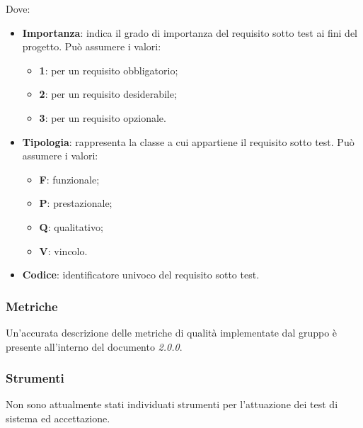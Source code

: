       Dove:
      \begin{itemize}
      	\item{\textbf{Importanza}: indica il grado di importanza del requisito sotto test ai fini del progetto. Può assumere i valori:}
      	\begin{itemize}
      		\item{\textbf{1}: per un requisito obbligatorio;}
      		\item{\textbf{2}: per un requisito desiderabile;}
      		\item{\textbf{3}: per un requisito opzionale.}
      	\end{itemize}
      	
      	\item{\textbf{Tipologia}: rappresenta la classe a cui appartiene il requisito sotto test. Può assumere i valori:}
      	\begin{itemize}
      		\item{\textbf{F}: funzionale;}
      		\item{\textbf{P}: prestazionale;}
      		\item{\textbf{Q}: qualitativo;}
      		\item{\textbf{V}: vincolo.}
      	\end{itemize}
      	
      	\item{\textbf{Codice}: identificatore univoco del requisito sotto test}.
      \end{itemize}
    \subsubsection{Metriche}
    Un'accurata descrizione delle metriche di qualità implementate dal gruppo è presente all'interno del documento \PdQ{} \textit{2.0.0}.
    \subsubsection{Strumenti}
    Non sono attualmente stati individuati strumenti per l'attuazione dei test di sistema ed accettazione.

